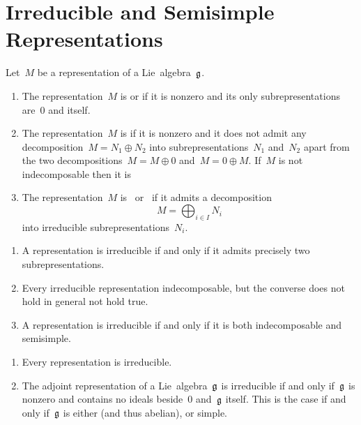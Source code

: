 \section{Irreducible and Semisimple Representations}


\begin{definition}
	Let~$M$ be a representation of a Lie~algebra~$\mathfrak{g}$.
	\begin{enumerate}
		\item
			The representation~$M$ is  or  if it is nonzero and its only subrepresentations are~$0$ and itself.
		\item
			The representation~$M$ is  if it is nonzero and it does not admit any decomposition~$M = N_1 \oplus N_2$ into subrepresentations~$N_1$ and~$N_2$ apart from the two decompositions~$M = M \oplus 0$ and~$M = 0 \oplus M$.
			If~$M$ is not indecomposable then it is 
		\item
			The representation~$M$ is~ or~ if it admits a decomposition
			\[
				M = \bigoplus_{i \in I} N_i
			\]
			into irreducible subrepresentations~$N_i$.
	\end{enumerate}
\end{definition}


\begin{remark}
	\leavevmode
	\begin{enumerate}
		\item
			A representation is irreducible if and only if it admits precisely two subrepresentations.
		\item
			Every irreducible representation indecomposable, but the converse does not hold in general not hold true.
		\item
			A representation is irreducible if and only if it is both indecomposable and semisimple.
	\end{enumerate}
\end{remark}


\begin{example}
	\leavevmode
	\begin{enumerate}
		\item
			Every {\onedimensional} representation is irreducible.
		\item
			The adjoint representation of a Lie~algebra~$\mathfrak{g}$ is irreducible if and only if~$\mathfrak{g}$ is nonzero and contains no ideals beside~$0$ and~$\mathfrak{g}$ itself.
			This is the case if and only if~$\mathfrak{g}$ is either {\onedimensional} (and thus abelian), or simple.
	\end{enumerate}
\end{example}


